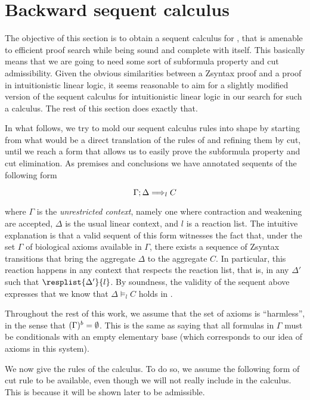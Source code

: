 \section{Backward sequent calculus}

The objective of this section is to obtain a sequent calculus for \eznd{}, that
is amenable to efficient proof search while being sound and complete with
\eznd{} itself. This basically means that we are going to need some sort of
subformula property and cut admissibility. Given the obvious similarities
between a Zsyntax proof and a proof in intuitionistic linear logic, it seems
reasonable to aim for a slightly modified version of the sequent calculus for
intuitionistic linear logic in our search for such a calculus. The rest of this
section does exactly that.

In what follows, we try to mold our sequent calculus rules into shape by
starting from what would be a direct translation of the rules of \eznd{} and
refining them by cut, until we reach a form that allows us to easily prove the
subformula property and cut elimination. As premises and conclusions we have
annotated sequents of the following form

\[
  \Gamma ; \Delta \Longrightarrow_{l} C
\]

where $\Gamma$ is the \emph{unrestricted context}, namely one where contraction
and weakening are accepted, $\Delta$ is the usual linear context, and $l$ is a
reaction list. The intuitive explanation is that a valid sequent of this form
witnesses the fact that, under the set $\Gamma$ of biological axioms available
in $\Gamma$, there exists a sequence of Zsyntax transitions that bring the
aggregate $\Delta$ to the aggregate $C$. In particular, this reaction happens in
any context that respects the reaction list, that is, in any $\Delta'$ such that
$\resplist{\Delta'}{l}$. By soundness, the validity of the sequent above
expresses that we know that $\Delta \models_{l} C$ holds in \eznd{}.

Throughout the rest of this work, we assume that the set of axioms is
``harmless'', in the sense that $(\Gamma)^{b} = \emptyset$.  This is the
same as saying that all formulas in $\Gamma$ must be conditionals with an empty
elementary base (which corresponds to our idea of axioms in this system).

We now give the rules of the calculus. To do so, we assume the following
form of cut rule to be available, even though we will not really include in the
calculus. This is because it will be shown later to be admissible.

